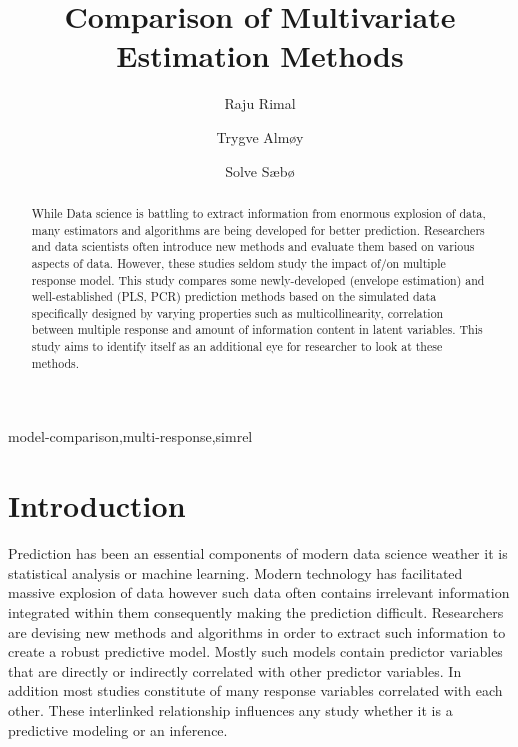 \documentclass[12pt,3p,authoryear]{elsarticle}
\theoremstyle{definition}
\theoremstyle{definition}
\theoremstyle{definition}
\theoremstyle{remark}
\begin{document}
\begin{frontmatter}

  \title{Comparison of Multivariate Estimation Methods}
  
    \author[KBM]{Raju Rimal}
    \author[KBM]{Trygve Almøy}
  
    \author[NMBU]{Solve Sæbø}
  
      \address[KBM]{Faculty of Chemistry and Bioinformatics, Norwegian University of Life
Sciences, Ås, Norway}
    \address[NMBU]{Prorector, Norwegian University of Life Sciences, Ås, Norway}
  
  \begin{abstract}
  While Data science is battling to extract information from enormous
  explosion of data, many estimators and algorithms are being developed
  for better prediction. Researchers and data scientists often introduce
  new methods and evaluate them based on various aspects of data. However,
  these studies seldom study the impact of/on multiple response model.
  This study compares some newly-developed (envelope estimation) and
  well-established (PLS, PCR) prediction methods based on the simulated
  data specifically designed by varying properties such as
  multicollinearity, correlation between multiple response and amount of
  information content in latent variables. This study aims to identify
  itself as an additional eye for researcher to look at these methods.
  \end{abstract}
   \begin{keyword} model-comparison,multi-response,simrel\end{keyword}

\end{frontmatter}

\section{Introduction}\label{introduction}

Prediction has been an essential components of modern data science
weather it is statistical analysis or machine learning. Modern
technology has facilitated massive explosion of data however such data
often contains irrelevant information integrated within them
consequently making the prediction difficult. Researchers are devising
new methods and algorithms in order to extract such information to
create a robust predictive model. Mostly such models contain predictor
variables that are directly or indirectly correlated with other
predictor variables. In addition most studies constitute of many
response variables correlated with each other. These interlinked
relationship influences any study whether it is a predictive modeling or
an inference.
\end{document}
